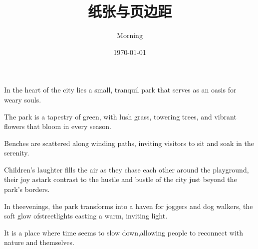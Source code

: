 \documentclass[12pt]{article}
\title{纸张与页边距}
\author{Morning}
\date{\today}
\begin{document}
\maketitle
\Large
In the heart of the city lies a small, tranquil park that serves as an oasis for weary souls.

The park is a tapestry of green, with lush grass, towering trees, and vibrant flowers that bloom in every season. 

Benches are scattered along winding paths, inviting visitors to sit and soak in the serenity.

Children's laughter fills the air as they chase each other around the playground, their joy astark contrast to the hustle and bustle of the city just beyond the park's borders.

In theevenings, the park transforms into a haven for joggers and dog walkers, the soft glow ofstreetlights casting a warm, inviting light.

It is a place where time seems to slow down,allowing people to reconnect with nature and themselves.
\end{document}

